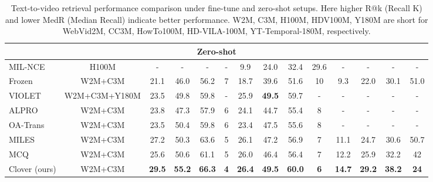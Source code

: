 \documentclass[10pt,twocolumn,letterpaper]{article}
\begin{document}
{\begin{table*}[t]
{\begin{tabular}{cccccccccccccc}
\multicolumn{14}{c}{Zero-shot} \\ \midrule
\multicolumn{1}{l|}{MIL-NCE \cite{miech2020end}} & \multicolumn{1}{c|}{H100M} & - & - & - & \multicolumn{1}{c|}{-}  & 9.9 & 24.0 & 32.4 & \multicolumn{1}{c|}{29.6}& - & - & - & - \\
\multicolumn{1}{l|}{Frozen \cite{bain2021frozen}} & \multicolumn{1}{c|}{W2M+C3M}  & 21.1 & 46.0 & 56.2 & \multicolumn{1}{c|}{7} & 18.7 & 39.6 & 51.6 & \multicolumn{1}{c|}{10} & 9.3 & 22.0 & 30.1 & 51.0 \\
\multicolumn{1}{l|}{VIOLET \cite{fu2021violet}} & \multicolumn{1}{c|}{W2M+C3M+Y180M} & 23.5 & 49.8 & 59.8 & \multicolumn{1}{c|}{-} & 25.9 & \textbf{49.5} & 59.7 & \multicolumn{1}{c|}{-} & - & - & - & - \\
\multicolumn{1}{l|}{ALPRO \cite{li2022alignandprompt}} & \multicolumn{1}{c|}{W2M+C3M}  & 23.8 & 47.3 & 57.9 & \multicolumn{1}{c|}{6} & 24.1 & 44.7 & 55.4 & \multicolumn{1}{c|}{8} & - & - & - & - \\
\multicolumn{1}{l|}{OA-Trans \cite{wang2022object}} & \multicolumn{1}{c|}{W2M+C3M}  & 23.5 & 50.4 & 59.8 & \multicolumn{1}{c|}{6} & 23.4 & 47.5 & 55.6 & \multicolumn{1}{c|}{8} & - & - & - & - \\
\multicolumn{1}{l|}{MILES \cite{ge2022miles}} & \multicolumn{1}{c|}{W2M+C3M}  & 27.2 & 50.3 & 63.6 &  \multicolumn{1}{c|}{5} & 26.1 & 47.2 & 56.9 & \multicolumn{1}{c|}{7} & 11.1 & 24.7 & 30.6 & 50.7 \\ 
\multicolumn{1}{l|}{MCQ \cite{ge2022bridging}} & \multicolumn{1}{c|}{W2M+C3M}  & 25.6 & 50.6 & 61.1 &  \multicolumn{1}{c|}{5} & 26.0 & 46.4 & 56.4 & \multicolumn{1}{c|}{7} & 12.2 & 25.9 & 32.2 & 42 \\ 
\midrule
\multicolumn{1}{l|}{Clover (ours)} & \multicolumn{1}{c|}{W2M+C3M}  & \textbf{29.5} & \textbf{55.2} & \textbf{66.3} & \multicolumn{1}{c|}{\textbf{4}} & \textbf{26.4} & \textbf{49.5} & \textbf{60.0} & \multicolumn{1}{c|}{\textbf{6}} & \textbf{14.7} & \textbf{29.2} & \textbf{38.2} & \textbf{24} \\ \bottomrule
\end{tabular}}
\caption{Text-to-video retrieval performance  comparison under {fine-tune} and {zero-shot} setups. Here {higher} R@k (Recall K) and {lower} MedR (Median Recall) indicate better performance. W2M, C3M, H100M, HDV100M, Y180M are short for WebVid2M\cite{bain2021frozen}, CC3M\cite{sharma2018conceptual}, HowTo100M\cite{miech2019howto100m},
HD-VILA-100M\cite{Xue_2022_CVPR},
YT-Temporal-180M\cite{zellers2021merlot}, respectively.}
\vspace{-0.2cm}
\label{tab:retrieval_SOTA}
\end{table*}

}
\end{document}

